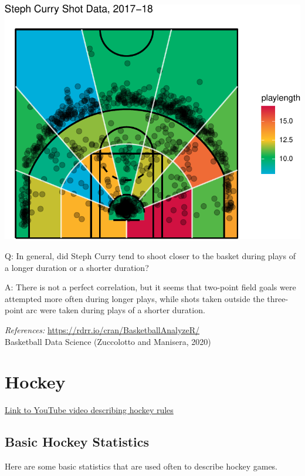 \documentclass[
  11pt,
]{book}
\theoremstyle{definition}
\theoremstyle{definition}
\theoremstyle{definition}
\theoremstyle{definition}
\theoremstyle{remark}
\begin{document}
\includegraphics{series_files/figure-latex/basketballanalyzer 8-1.pdf}

Q: In general, did Steph Curry tend to shoot closer to the basket during plays of a longer duration or a shorter duration?

A: There is not a perfect correlation, but it seems that two-point field goals were attempted more often during longer plays, while shots taken outside the three-point arc were taken during plays of a shorter duration.

\emph{References:}
\url{https://rdrr.io/cran/BasketballAnalyzeR/}\\
Basketball Data Science (Zuccolotto and Manisera, 2020)

\newpage

\hypertarget{hockey}{%
\section{Hockey}\label{hockey}}

\href{https://www.youtube.com/watch?v=nv2FUnHceqU}{Link to YouTube video describing hockey rules}

\hypertarget{basic-hockey-statistics}{%
\subsection{Basic Hockey Statistics}\label{basic-hockey-statistics}}

Here are some basic statistics that are used often to describe hockey games.
\end{document}

